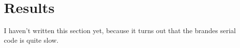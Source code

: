 \section{Results}

I haven't written this section yet, because it turns out that the brandes
serial code is quite slow.
